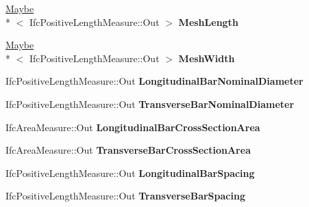 \begin{DoxyCompactItemize}
\item 
\hypertarget{struct_assimp_1_1_i_f_c_1_1_ifc_reinforcing_mesh_ab3e3fe94c9c881307050942511240fb3}{\hyperlink{struct_assimp_1_1_s_t_e_p_1_1_maybe}{Maybe}\\*
$<$ Ifc\+Positive\+Length\+Measure\+::\+Out $>$ {\bfseries Mesh\+Length}}\label{struct_assimp_1_1_i_f_c_1_1_ifc_reinforcing_mesh_ab3e3fe94c9c881307050942511240fb3}

\item 
\hypertarget{struct_assimp_1_1_i_f_c_1_1_ifc_reinforcing_mesh_aa32c391a138bb1f0b4ffa19bb53955aa}{\hyperlink{struct_assimp_1_1_s_t_e_p_1_1_maybe}{Maybe}\\*
$<$ Ifc\+Positive\+Length\+Measure\+::\+Out $>$ {\bfseries Mesh\+Width}}\label{struct_assimp_1_1_i_f_c_1_1_ifc_reinforcing_mesh_aa32c391a138bb1f0b4ffa19bb53955aa}

\item 
\hypertarget{struct_assimp_1_1_i_f_c_1_1_ifc_reinforcing_mesh_afad2820f5e80dac7f4f858d6cc8cac71}{Ifc\+Positive\+Length\+Measure\+::\+Out {\bfseries Longitudinal\+Bar\+Nominal\+Diameter}}\label{struct_assimp_1_1_i_f_c_1_1_ifc_reinforcing_mesh_afad2820f5e80dac7f4f858d6cc8cac71}

\item 
\hypertarget{struct_assimp_1_1_i_f_c_1_1_ifc_reinforcing_mesh_a6474a400904a20e28d13362e04e759ac}{Ifc\+Positive\+Length\+Measure\+::\+Out {\bfseries Transverse\+Bar\+Nominal\+Diameter}}\label{struct_assimp_1_1_i_f_c_1_1_ifc_reinforcing_mesh_a6474a400904a20e28d13362e04e759ac}

\item 
\hypertarget{struct_assimp_1_1_i_f_c_1_1_ifc_reinforcing_mesh_a28f0043555c0735edbc09cab51138d0a}{Ifc\+Area\+Measure\+::\+Out {\bfseries Longitudinal\+Bar\+Cross\+Section\+Area}}\label{struct_assimp_1_1_i_f_c_1_1_ifc_reinforcing_mesh_a28f0043555c0735edbc09cab51138d0a}

\item 
\hypertarget{struct_assimp_1_1_i_f_c_1_1_ifc_reinforcing_mesh_ac91b4a602620716f038dcb4eded34a49}{Ifc\+Area\+Measure\+::\+Out {\bfseries Transverse\+Bar\+Cross\+Section\+Area}}\label{struct_assimp_1_1_i_f_c_1_1_ifc_reinforcing_mesh_ac91b4a602620716f038dcb4eded34a49}

\item 
\hypertarget{struct_assimp_1_1_i_f_c_1_1_ifc_reinforcing_mesh_ac7935ba723c656e81391d866d8824d79}{Ifc\+Positive\+Length\+Measure\+::\+Out {\bfseries Longitudinal\+Bar\+Spacing}}\label{struct_assimp_1_1_i_f_c_1_1_ifc_reinforcing_mesh_ac7935ba723c656e81391d866d8824d79}

\item 
\hypertarget{struct_assimp_1_1_i_f_c_1_1_ifc_reinforcing_mesh_a5df066df6e4206c58e26d47d8d52328b}{Ifc\+Positive\+Length\+Measure\+::\+Out {\bfseries Transverse\+Bar\+Spacing}}\label{struct_assimp_1_1_i_f_c_1_1_ifc_reinforcing_mesh_a5df066df6e4206c58e26d47d8d52328b}

\end{DoxyCompactItemize}
